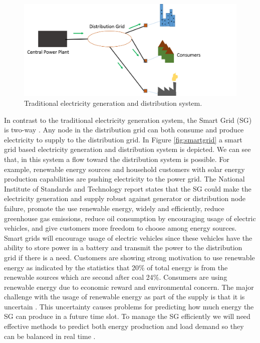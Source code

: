 \begin{figure}[h]
  \includegraphics[width=\linewidth]{traditional.png}
  \caption{Traditional electricity generation and distribution system.}
  \label{fig:tradgrid}
\end{figure}

In contrast to the traditional electricity generation system, the Smart Grid (SG) is two-way \cite{fang2012smart}. Any node in the distribution grid can both consume and produce electricity to supply to the distribution grid. In Figure \ref{fig:smartgrid} a smart grid based electricity generation and distribution system is depicted. We can see that, in this system a flow toward the distribution system is possible. For example, renewable energy sources and household customers with solar energy production capabilities are pushing electricity to the power grid. The National Institute of Standards and Technology report \cite{fang2012smart} states that the SG could make the electricity generation and supply robust against generator or distribution node failure, promote the use renewable energy, widely and efficiently, reduce greenhouse gas emissions, reduce oil consumption by encouraging usage of electric vehicles, and give customers more freedom to choose among energy sources. Smart grids will encourage usage of electric vehicles since these vehicles have the ability to store power in a battery and transmit the power to the distribution grid if there is a need. Customers are showing strong motivation to use renewable energy as indicated by the statistics that 20\% of total energy is from the renewable sources which are second after coal 24\%. Consumers are using renewable energy due to economic reward and environmental concern. The major challenge with the usage of renewable energy as part of the supply is that it is uncertain \cite{richter2012transitioning}. This uncertainty causes problems for predicting how much energy the SG can produce in a future time slot. To manage the SG efficiently we will need effective methods to predict both energy production and load demand so they can be balanced in real time \cite{potter2009building}.

